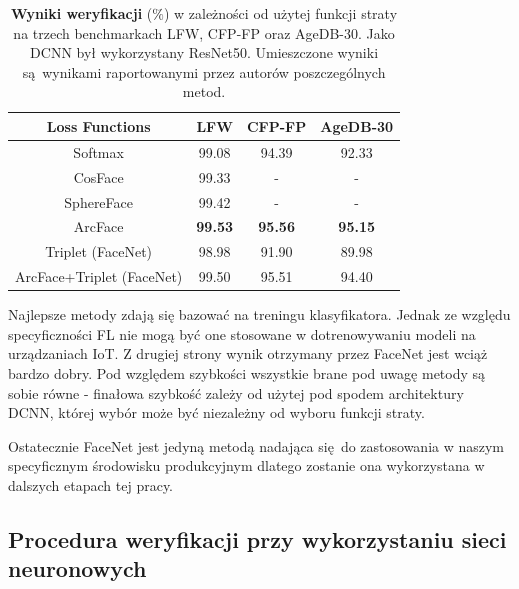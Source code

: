  \begin{table}[ht!]
  \begin{center}
  \begin{tabular}{cccc}
  \hline
  Loss Functions   & LFW & CFP-FP & AgeDB-30 \\
  \hline
  Softmax              & 99.08 & 94.39 & 92.33 \\
  CosFace & 99.33 & - & - \\
  SphereFace  & 99.42 & - & - \\
  ArcFace      & {\bf 99.53} & {\bf 95.56} & {\bf 95.15}\\
  \hline
  Triplet (FaceNet)       & 98.98 & 91.90 & 89.98 \\
  ArcFace+Triplet (FaceNet)      & 99.50 & 95.51 & 94.40  \\
  \hline
  \end{tabular}
  \end{center}
  \vspace{-2mm}
  \caption{\textbf{Wyniki weryfikacji} ($\%$) w zależności od użytej funkcji straty na trzech benchmarkach LFW, CFP-FP oraz AgeDB-30. Jako DCNN był wykorzystany ResNet50. Umieszczone wyniki są wynikami raportowanymi przez autorów poszczególnych metod.}
  \label{table:losscompare}
  \vspace{-3mm}
  \end{table}

  Najlepsze metody zdają się bazować na treningu klasyfikatora. Jednak ze względu specyficzności
  FL nie mogą być one stosowane w dotrenowywaniu modeli na urządzaniach IoT. Z drugiej strony wynik otrzymany przez FaceNet jest wciąż bardzo dobry. Pod względem szybkości wszystkie brane pod uwagę metody są sobie równe - finałowa szybkość zależy od użytej pod spodem architektury DCNN, której wybór może być niezależny od wyboru funkcji straty. 

  Ostatecznie FaceNet jest jedyną metodą nadająca się do zastosowania w naszym specyficznym środowisku produkcyjnym dlatego zostanie ona wykorzystana w dalszych etapach tej pracy.
  


\subsection{Procedura weryfikacji przy wykorzystaniu sieci neuronowych}\label{sec:verify_process}

